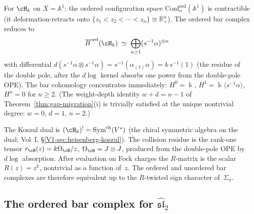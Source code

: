 \begin{computation}
\label{comp:ordered-bar-heisenberg}
For $\cH_k$ on $X=\mathbb A^1$: the ordered configuration
space $\mathrm{Conf}_n^{\mathrm{ord}}(\mathbb A^1)$ is
contractible (it deformation-retracts onto
$\{z_1<z_2<\cdots<z_n\}\cong\mathbb R^n_+$).
The ordered bar complex reduces to
\[
\Barchord(\cH_k)
\;\simeq\;
\bigoplus_{n\ge 1}(s^{-1}\alpha)^{\otimes n}
\]
with differential $d(s^{-1}\alpha\otimes s^{-1}\alpha)
=s^{-1}(\alpha_{(1)}\alpha)=k\,s^{-1}(1)$
(the residue of the double pole, after the $d\log$ kernel
absorbs one power from the double-pole OPE).
The bar cohomology concentrates immediately:
$H^0=\Bbbk$, $H^1=\Bbbk\langle s^{-1}\alpha\rangle$,
$H^n=0$ for $n\ge 2$.
(The weight-depth identity $w + d = n - 1$ of
Theorem~\ref{thm:gap-migration}(i) is trivially
satisfied at the unique nontrivial degree: $w = 0$,
$d = 1$, $n = 2$.)

The Koszul dual is $(\cH_k)^!=\mathrm{Sym}^{\mathrm{ch}}(V^*)$
(the chiral symmetric algebra on the dual; Vol~I, \S\ref*{V1-sec:heisenberg-koszul}). The collision residue is the rank-one tensor
$r_{\cH}(z)=k\Omega_{\cH}/z$, $\Omega_{\cH}=J\otimes J$, produced from the double-pole OPE by $d\log$ absorption. After evaluation on Fock charges the $R$-matrix is the scalar $R(z)=z^k$, nontrivial as a function of~$z$. The ordered and unordered bar complexes are therefore equivalent up to the $R$-twisted sign character of~$\Sigma_n$.
\end{computation}

\subsection{The ordered bar complex for $\widehat{\mathfrak{sl}}_2$}
\label{subsec:ordered-bar-sl2}

